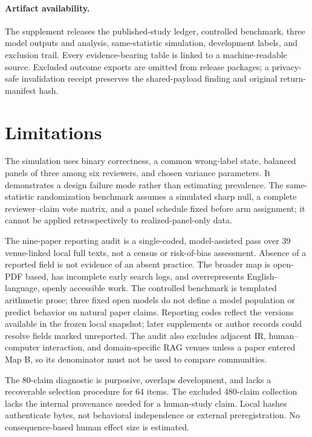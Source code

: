 \documentclass[11pt]{article}
\begin{document}
\paragraph{Artifact availability.}
The supplement releases the published-study ledger, controlled benchmark,
three model outputs and analysis, same-statistic simulation, development
labels, and exclusion trail. Every evidence-bearing table is linked to a
machine-readable source. Excluded outcome exports are omitted from release
packages; a privacy-safe invalidation receipt preserves the shared-payload
finding and original return-manifest hash.

\section*{Limitations}

The simulation uses binary correctness, a common wrong-label state, balanced
panels of three among six reviewers, and chosen variance parameters. It
demonstrates a design failure mode rather than estimating prevalence. The
same-statistic randomization benchmark assumes a simulated sharp null, a
complete reviewer--claim vote matrix, and a panel schedule fixed before arm
assignment; it cannot be applied retrospectively to realized-panel-only data.

The nine-paper reporting audit is a single-coded, model-assisted pass over 39
venue-linked local full texts, not a census or risk-of-bias assessment.
Absence of a reported field is not evidence of an absent practice. The broader
map is open-PDF based, has incomplete early search logs, and overrepresents
English-language, openly accessible work. The controlled benchmark is
templated arithmetic prose; three fixed open models do not define a model
population or predict behavior on natural paper claims.
Reporting codes reflect the versions available in the frozen local snapshot;
later supplements or author records could resolve fields marked unreported.
The audit also excludes adjacent IR, human--computer interaction, and
domain-specific RAG venues unless a paper entered Map B, so its denominator
must not be used to compare communities.

The 80-claim diagnostic is purposive, overlaps development, and lacks a
recoverable selection procedure for 64 items. The excluded 480-claim
collection lacks the internal provenance needed for a human-study claim.
Local hashes authenticate bytes, not behavioral independence or external
preregistration. No consequence-based human effect size is estimated.
\end{document}
